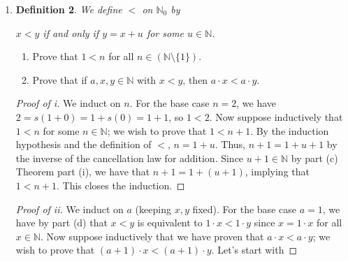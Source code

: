 \documentclass[titlepage]{article}
\newtheorem*{definition*}{Definition}
\theoremstyle{definition}
\newcommand{\N}{\mathbb{N}}
\begin{document}
\begin{enumerate}
\begin{enumerate}[label={(\alph*)}]
\begin{definition*}
\begin{align*}
                x\cdot 0 &= 0\\
                x\cdot s(y) &= x\cdot y+x
            \end{align*}
        \end{definition*}
        Prove that $x\cdot 1=x$ for all $x\in\N_0$.
        \begin{proof}
            Since $s(0)=1$,
            \begin{align*}
                x\cdot 1 &= x\cdot s(0)
                \intertext{By the definition of multiplication, the above is}
                &= x\cdot 0+x
                \intertext{From the above, we can use the definition of multiplication to substitute $x\cdot 0=0$.}
                &= 0+x
                \intertext{Now just apply part (ii) of the Theorem in part (c).}
                &= x
            \end{align*}
        \end{proof}
        \item \leavevmode\vspace{-1.6em}
        \begin{definition*}
            We define $<$ on $\N_0$ by
            \begin{center}
                $x<y$ if and only if $y=x+u$ for some $u\in\N$.
            \end{center}
        \end{definition*}
        \begin{enumerate}
            \item Prove that $1<n$ for all $n\in(\N\setminus\{1\})$.
            \item Prove that if $a,x,y\in\N$ with $x<y$, then $a\cdot x<a\cdot y$.
        \end{enumerate}
        \begin{proof}[Proof of i]
            We induct on $n$. For the base case $n=2$, we have $2=s(1+0)=1+s(0)=1+1$, so $1<2$. Now suppose inductively that $1<n$ for some $n\in\N$; we wish to prove that $1<n+1$. By the induction hypothesis and the definition of $<$, $n=1+u$. Thus, $n+1=1+u+1$ by the inverse of the cancellation law for addition. Since $u+1\in\N$ by part (c) Theorem part (i), we have that $n+1=1+(u+1)$, implying that $1<n+1$. This closes the induction.
        \end{proof}
        \begin{proof}[Proof of ii]
            We induct on $a$ (keeping $x,y$ fixed). For the base case $a=1$, we have by part (d) that $x<y$ is equivalent to $1\cdot x<1\cdot y$ since $x=1\cdot x$ for all $x\in\N$. Now suppose inductively that we have proven that $a\cdot x<a\cdot y$; we wish to prove that $(a+1)\cdot x<(a+1)\cdot y$. Let's start with

\end{proof}
\end{enumerate}
\end{enumerate}
\end{document}
